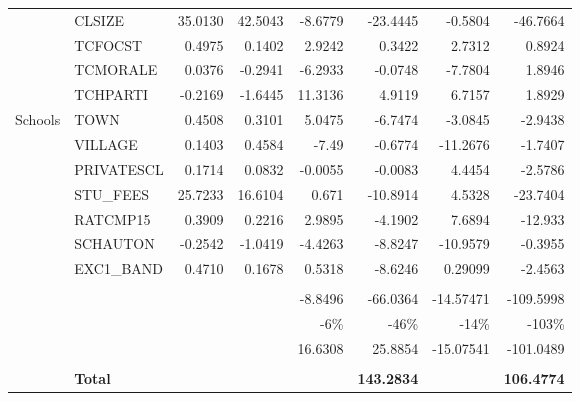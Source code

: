 \documentclass[10pt]{article}
\begin{document}
\begin{table}[htbp]
\begin{tabular}{llrrrrrr}
          & CLSIZE & 35.0130 & 42.5043 & -8.6779 & -23.4445 & -0.5804 & -46.7664 \\[0.4em]
          & TCFOCST & 0.4975 & 0.1402 & 2.9242 & 0.3422 & 2.7312 & 0.8924 \\[0.4em]
          & TCMORALE & 0.0376 & -0.2941 & -6.2933 & -0.0748 & -7.7804 & 1.8946 \\[0.4em]
          & TCHPARTI & -0.2169 & -1.6445 & 11.3136 & 4.9119 & 6.7157 & 1.8929 \\[0.4em]
    Schools & TOWN  & 0.4508 & 0.3101 & 5.0475 & -6.7474 & -3.0845 & -2.9438 \\[0.4em]
          & VILLAGE & 0.1403 & 0.4584 & -7.49 & -0.6774 & -11.2676 & -1.7407 \\[0.4em]
          & PRIVATESCL & 0.1714 & 0.0832 & -0.0055 & -0.0083 & 4.4454 & -2.5786 \\[0.4em]
          & STU\_FEES & 25.7233 & 16.6104 & 0.671 & -10.8914 & 4.5328 & -23.7404 \\[0.4em]
          & RATCMP15 & 0.3909 & 0.2216 & 2.9895 & -4.1902 & 7.6894 & -12.933 \\[0.4em]
          & SCHAUTON & -0.2542 & -1.0419 & -4.4263 & -8.8247 & -10.9579 & -0.3955 \\[0.4em]
          & EXC1\_BAND & 0.4710 & 0.1678 & 0.5318 & -8.6246 & 0.29099 & -2.4563 \\[0.4em]
          \cline{5-8} \\
          &       &       &       & -8.8496 & -66.0364 & -14.57471 & -109.5998 \\ [0.4em]
          &       &       &       & -6\%  & -46\% & -14\% & -103\% \\ [0.4em]
          &       &       &       & 16.6308 & 25.8854 & -15.07541 & -101.0489 \\[0.4em] 
          \cline{2-8} \\
          & \textbf{Total}      &       &  & \textbf{} & \textbf{143.2834} & \textbf{} & \textbf{106.4774} \\
    \bottomrule
    \end{tabular}%
  \label{tab:addlabel}%
\end{table}%
\end{document}

